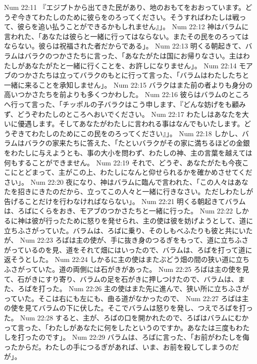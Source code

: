 Num 22:11  『エジプトから出てきた民があり、地のおもてをおおっています。どうぞ今きてわたしのために彼らをのろってください。そうすればわたしは戦って、彼らを追い払うことができるかもしれません』」。
Num 22:12  神はバラムに言われた、「あなたは彼らと一緒に行ってはならない。またその民をのろってはならない。彼らは祝福された者だからである」。
Num 22:13  明くる朝起きて、バラムはバラクのつかさたちに言った、「あなたがたは国にお帰りなさい。主はわたしがあなたがたと一緒に行くことを、お許しになりません」。
Num 22:14  モアブのつかさたちは立ってバラクのもとに行って言った、「バラムはわたしたちと一緒に来ることを承知しません」。
Num 22:15  バラクはまた前の者よりも身分の高いつかさたちを前よりも多くつかわした。
Num 22:16  彼らはバラムのところへ行って言った、「チッポルの子バラクはこう申します、『どんな妨げをも顧みず、どうぞわたしのところへおいでください。
Num 22:17  わたしはあなたを大いに優遇します。そしてあなたがわたしに言われる事はなんでもいたします。どうぞきてわたしのためにこの民をのろってください』」。
Num 22:18  しかし、バラムはバラクの家来たちに答えた、「たといバラクがその家に満ちるほどの金銀をわたしに与えようとも、事の大小を問わず、わたしの神、主の言葉を越えては何もすることができません。
Num 22:19  それで、どうぞ、あなたがたも今夜ここにとどまって、主がこの上、わたしになんと仰せられるかを確かめさせてください」。
Num 22:20  夜になり、神はバラムに臨んで言われた、「この人々はあなたを招きにきたのだから、立ってこの人々と一緒に行きなさい。ただしわたしが告げることだけを行わなければならない」。
Num 22:21  明くる朝起きてバラムは、ろばにくらをおき、モアブのつかさたちと一緒に行った。
Num 22:22  しかるに神は彼が行ったために怒りを発せられ、主の使は彼を妨げようとして、道に立ちふさがっていた。バラムは、ろばに乗り、そのしもべふたりも彼と共にいたが、
Num 22:23  ろばは主の使が、手に抜き身のつるぎをもって、道に立ちふさがっているのを見、道をそれて畑にはいったので、バラムは、ろばを打って道に返そうとした。
Num 22:24  しかるに主の使はまたぶどう畑の間の狭い道に立ちふさがっていた。道の両側には石がきがあった。
Num 22:25  ろばは主の使を見て、石がきにすり寄り、バラムの足を石がきに押しつけたので、バラムは、また、ろばを打った。
Num 22:26  主の使はまた先に進んで、狭い所に立ちふさがっていた。そこは右にも左にも、曲る道がなかったので、
Num 22:27  ろばは主の使を見てバラムの下に伏した。そこでバラムは怒りを発し、つえでろばを打った。
Num 22:28  すると、主が、ろばの口を開かれたので、ろばはバラムにむかって言った、「わたしがあなたに何をしたというのですか。あなたは三度もわたしを打ったのです」。
Num 22:29  バラムは、ろばに言った、「お前がわたしを侮ったからだ。わたしの手につるぎがあれば、いま、お前を殺してしまうのだが」。
